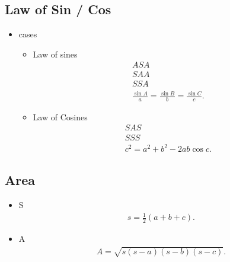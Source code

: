 \documentclass{report}
\begin{document}
     \bigbreak \noindent \bigbreak \noindent 
     \subsection{Law of Sin / Cos}
     \begin{itemize}
       \item cases
         \begin{itemize}
           \item Law of sines
          \begin{align*}
            ASA \\
            SAA \\
            SSA \\
            \frac{\sin{A}}{a} = \frac{\sin{B}}{b} = \frac{\sin{C}}{c}
         .\end{align*}
       \item Law of Cosines
         \begin{align*}
           SAS \\
           SSS \\
           c^{2} = a^{2} +b^{2}-2ab\cos{c}
         .\end{align*}
         \end{itemize}
     \end{itemize}

     \bigbreak \noindent \bigbreak \noindent 
     \subsection{Area}
     \begin{itemize}
       \item S
         \begin{align*}
           s = \frac{1}{2}(a+b+c)
         .\end{align*}
        \item A
          \begin{align*}
            A = \sqrt{s(s-a)(s-b)(s-c)}
          .\end{align*}
     \end{itemize}

     \bigbreak \noindent \bigbreak \noindent 
\end{document}
